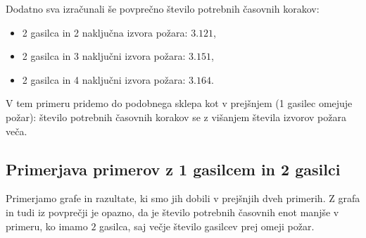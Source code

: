 \documentclass[a4paper, 12pt]{article}
\begin{document}
\begin{figure}[!htb]
    \endminipage
\end{figure}

\pagebreak

\noindent Dodatno sva izračunali še povprečno število potrebnih časovnih korakov:
\begin{itemize}
    \item 2 gasilca in 2 naključna izvora požara: $3.121$,
    \item 2 gasilca in 3 naključni izvora požara: $3.151$,
    \item 2 gasilca in 4 naključni izvora požara: $3.164$.
\end{itemize}

\noindent V tem primeru pridemo do podobnega sklepa kot v prejšnjem (1 gasilec omejuje požar):
število potrebnih časovnih korakov se z višanjem števila izvorov požara veča. 

\subsection{Primerjava primerov z 1 gasilcem in 2 gasilci}
Primerjamo grafe in razultate, ki smo jih dobili v prejšnjih dveh primerih.
Z grafa in tudi iz povprečji je opazno, da je število potrebnih časovnih enot manjše v primeru, ko
imamo $2$ gasilca, saj večje število gasilcev prej omeji požar. 


% 
% 

\end{document}
